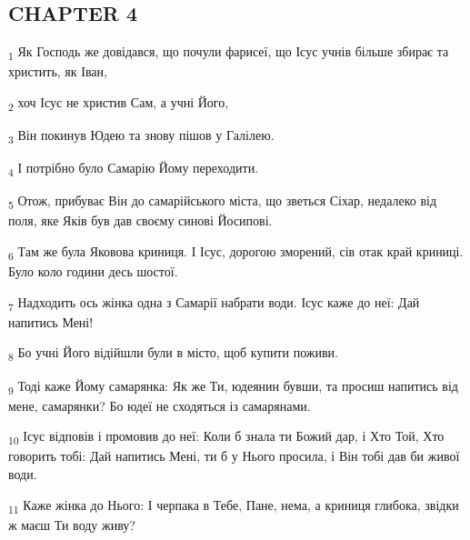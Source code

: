 \subsection{CHAPTER 4}
\begin{tcolorbox}
\textsubscript{1} Як Господь же довідався, що почули фарисеї, що Ісус учнів більше збирає та христить, як Іван,
\end{tcolorbox}
\begin{tcolorbox}
\textsubscript{2} хоч Ісус не христив Сам, а учні Його,
\end{tcolorbox}
\begin{tcolorbox}
\textsubscript{3} Він покинув Юдею та знову пішов у Галілею.
\end{tcolorbox}
\begin{tcolorbox}
\textsubscript{4} І потрібно було Самарію Йому переходити.
\end{tcolorbox}
\begin{tcolorbox}
\textsubscript{5} Отож, прибуває Він до самарійського міста, що зветься Сіхар, недалеко від поля, яке Яків був дав своєму синові Йосипові.
\end{tcolorbox}
\begin{tcolorbox}
\textsubscript{6} Там же була Яковова криниця. І Ісус, дорогою зморений, сів отак край криниці. Було коло години десь шостої.
\end{tcolorbox}
\begin{tcolorbox}
\textsubscript{7} Надходить ось жінка одна з Самарії набрати води. Ісус каже до неї: Дай напитись Мені!
\end{tcolorbox}
\begin{tcolorbox}
\textsubscript{8} Бо учні Його відійшли були в місто, щоб купити поживи.
\end{tcolorbox}
\begin{tcolorbox}
\textsubscript{9} Тоді каже Йому самарянка: Як же Ти, юдеянин бувши, та просиш напитись від мене, самарянки? Бо юдеї не сходяться із самарянами.
\end{tcolorbox}
\begin{tcolorbox}
\textsubscript{10} Ісус відповів і промовив до неї: Коли б знала ти Божий дар, і Хто Той, Хто говорить тобі: Дай напитись Мені, ти б у Нього просила, і Він тобі дав би живої води.
\end{tcolorbox}
\begin{tcolorbox}
\textsubscript{11} Каже жінка до Нього: І черпака в Тебе, Пане, нема, а криниця глибока, звідки ж маєш Ти воду живу?
\end{tcolorbox}

